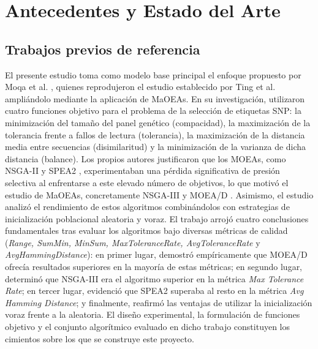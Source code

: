 \chapter{Antecedentes y Estado del Arte}

\section{Trabajos previos de referencia}

El presente estudio toma como modelo base principal el enfoque propuesto por Moqa et al. \cite{moqa2022assessing}, quienes reprodujeron el estudio establecido por Ting et al. \cite{ting2010multi} ampliándolo mediante la aplicación de MaOEAs. En su investigación, utilizaron cuatro funciones objetivo para el problema de la selección de etiquetas SNP: la minimización del tamaño del panel genético (compacidad), la maximización de la tolerancia frente a fallos de lectura (tolerancia), la maximización de la distancia media entre secuencias (disimilaritud) y la minimización de la varianza de dicha distancia (balance). Los propios autores justificaron que los MOEAs, como NSGA-II \cite{deb2002fast} y SPEA2 \cite{zitzler2001spea2}, experimentaban una pérdida significativa de presión selectiva al enfrentarse a este elevado número de objetivos, lo que motivó el estudio de MaOEAs, concretamente NSGA-III \cite{deb2013evolutionary} y MOEA/D \cite{zhang2007moea}. Asimismo, el estudio analizó el rendimiento de estos algoritmos combinándolos con estrategias de inicialización poblacional aleatoria y voraz. El trabajo arrojó cuatro conclusiones fundamentales tras evaluar los algoritmos bajo diversas métricas de calidad (\textit{Range, SumMin, MinSum, MaxToleranceRate, AvgToleranceRate} y \textit{AvgHammingDistance}): en primer lugar, demostró empíricamente que MOEA/D ofrecía resultados superiores en la mayoría de estas métricas; en segundo lugar, determinó que NSGA-III era el algoritmo superior en la métrica \textit{Max Tolerance Rate}; en tercer lugar, evidenció que SPEA2 superaba al resto en la métrica \textit{Avg Hamming Distance}; y finalmente, reafirmó las ventajas de utilizar la inicialización voraz frente a la aleatoria. El diseño experimental, la formulación de funciones objetivo y el conjunto algorítmico evaluado en dicho trabajo constituyen los cimientos sobre los que se construye este proyecto.

